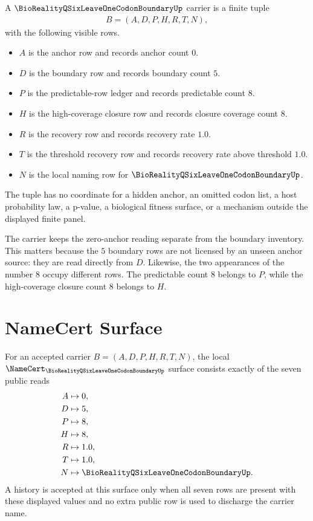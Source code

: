 \begin{definition}
\label{def:bioreality-q-six-leave-one-codon-boundary-carrier}
A $\BioRealityQSixLeaveOneCodonBoundaryUp$ carrier is a finite tuple
$$
\begin{gathered}
B=(A,D,P,H,R,T,N),
\end{gathered}
$$
with the following visible rows.
\begin{itemize}
\item $A$ is the anchor row and records anchor count $0$.
\item $D$ is the boundary row and records boundary count $5$.
\item $P$ is the predictable-row ledger and records predictable count $8$.
\item $H$ is the high-coverage closure row and records closure coverage count $8$.
\item $R$ is the recovery row and records recovery rate $1.0$.
\item $T$ is the threshold recovery row and records recovery rate above threshold $1.0$.
\item $N$ is the local naming row for $\BioRealityQSixLeaveOneCodonBoundaryUp$.
\end{itemize}
The tuple has no coordinate for a hidden anchor, an omitted codon list, a host probability law, a p-value, a biological fitness surface, or a mechanism outside the displayed finite panel.
\end{definition}

The carrier keeps the zero-anchor reading separate from the boundary inventory. This matters because the $5$ boundary rows are not licensed by an unseen anchor source: they are read directly from $D$. Likewise, the two appearances of the number $8$ occupy different rows. The predictable count $8$ belongs to $P$, while the high-coverage closure count $8$ belongs to $H$.

\section{NameCert Surface}
\label{sec:bioreality-q-six-leave-one-codon-boundary-namecert-surface}

\begin{definition}
\label{def:bioreality-q-six-leave-one-codon-boundary-namecert-surface}
For an accepted carrier $B=(A,D,P,H,R,T,N)$, the local $\NameCert_{\BioRealityQSixLeaveOneCodonBoundaryUp}$ surface consists exactly of the seven public reads
$$
\begin{aligned}
A &\mapsto 0,\\
D &\mapsto 5,\\
P &\mapsto 8,\\
H &\mapsto 8,\\
R &\mapsto 1.0,\\
T &\mapsto 1.0,\\
N &\mapsto \BioRealityQSixLeaveOneCodonBoundaryUp.
\end{aligned}
$$
A history is accepted at this surface only when all seven rows are present with these displayed values and no extra public row is used to discharge the carrier name.
\end{definition}

